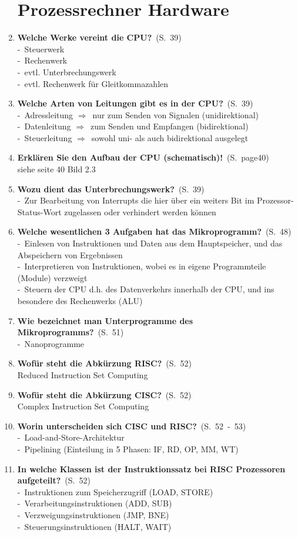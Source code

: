 \documentclass[a4paper,12pt]{article}
\newcommand{\question}[3]{\pagebreak[3]\item {\textbf{#1?}}\ (S.\ #2)#3}
\newcommand{\statement}[3]{\pagebreak[3]\item {\textbf{#1!}}\ (S.\ #2)#3}
\newcommand{\catchword}[1]{\\-\ #1}
\newcommand{\normaltext}[1]{\\#1}
\newcommand{\resultol}[1]{ $\Rightarrow$\ #1}
\newcommand{\page}[1]{#1}
\newcommand{\pages}[2]{#1\ -\ #2}
\begin{document}
\begin{enumerate}
  \newpage
  \section{Prozessrechner Hardware}

  \question{Welche Werke vereint die CPU}{\page{39}}
  {
    \catchword{Steuerwerk}
    \catchword{Rechenwerk}
    \catchword{evtl. Unterbrechungswerk}
    \catchword{evtl. Rechenwerk für Gleitkommazahlen}
  }

   \question{Welche Arten von Leitungen gibt es in der CPU}{\page{39}}
  {
    \catchword{Adressleitung \resultol{nur zum Senden von Signalen (unidirektional)}}
    \catchword{Datenleitung \resultol{zum Senden und Empfangen (bidirektional)}}
    \catchword{Steuerleitung \resultol{sowohl uni- als auch bidirektional ausgelegt}}
  }

  \statement{Erklären Sie den Aufbau der CPU (schematisch)} {page{40}}
  {
  \normaltext{siehe seite 40 Bild 2.3}
  }

     \question{Wozu dient das Unterbrechungswerk}{\page{39}}
  {
    \catchword{Zur Bearbeitung von Interrupts die hier über ein weiters Bit im Prozessor-
    Status-Wort zugelassen oder verhindert werden können}
  }

   \question{Welche wesentlichen 3 Aufgaben hat das Mikroprogramm}{\page{48}}
  {
    \catchword{Einlesen von Instruktionen und Daten aus dem Hauptspeicher, und das Abspeichern 
    von Ergebnissen}
    \catchword{Interpretieren von Instruktionen, wobei es in eigene Programmteile (Module) verzweigt}
    \catchword{Steuern der CPU d.h. des Datenverkehrs innerhalb der CPU, und ins besondere 
    des Rechenwerks (ALU)}
  }

   \question{Wie bezeichnet man Unterprogramme des Mikroprogramms}{\page{51}}
  {
    \catchword{Nanoprogramme}
  }

   \question{Wofür steht die Abkürzung RISC}{\page{52}}
  {
    \normaltext{Reduced Instruction Set Computing}
  }

   \question{Wofür steht die Abkürzung CISC}{\page{52}}
  {
    \normaltext{Complex Instruction Set Computing}
  }

   \question{Worin unterscheiden sich CISC und RISC}{\pages{52}{53}}
  {
    \catchword{Load-and-Store-Architektur}
    \catchword{Pipelining (Einteilung in 5 Phasen: IF, RD, OP, MM, WT)}
  }

   \question{In welche Klassen ist der Instruktionssatz bei RISC Prozessoren aufgeteilt}{\page{52}}
  {
    \catchword{Instruktionen zum Speicherzugriff (LOAD, STORE)}
    \catchword{Verarbeitungsinstruktionen (ADD, SUB)}
    \catchword{Verzweigungsinstruktionen (JMP, BNE)}
    \catchword{Steuerungsinstruktionen (HALT, WAIT)}
  }


\end{enumerate}
\end{document}
